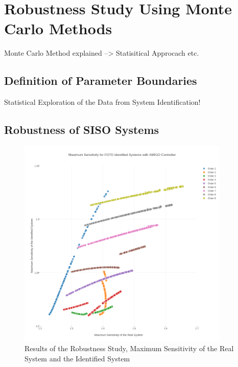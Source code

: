 \chapter{Robustness Study Using Monte Carlo Methods}
\label{c:robustness}

Monte Carlo Method explained --> Statisitical Approcach etc.

\section{Definition of Parameter Boundaries}%
\label{c:robustness:s:parameter}

Statistical Exploration of the Data from System Identification!

\section{Robustness of SISO Systems} %
\label{c:robustness:s:siso}

\begin{figure}[H]
\begin{minipage}[b]{\textwidth}
\centering
\includegraphics[width=0.9\textwidth]{./Graphics/PT9-Study.png}
\caption{Results of the Robustness Study, Maximum Sensitivity of the Real System and the Identified System}
\label{c:control:f:robustness_study}
\end{minipage}
\end{figure}

